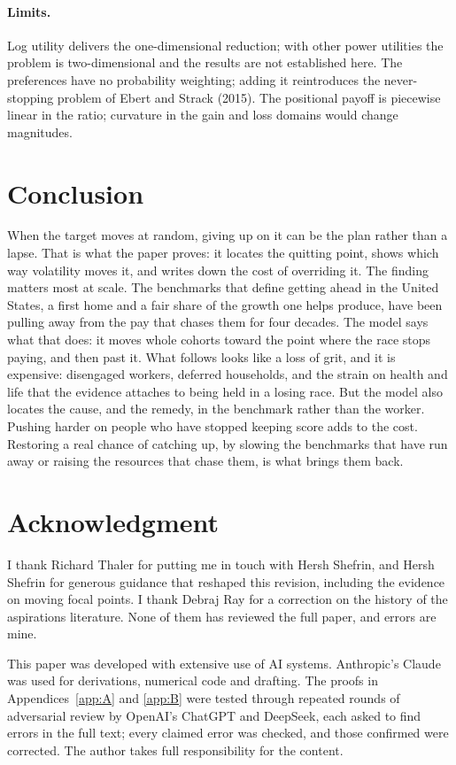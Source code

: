 \documentclass[12pt]{article}
\theoremstyle{definition}
\theoremstyle{remark}
\theoremstyle{plain}
\theoremstyle{definition}
\begin{document}
\paragraph{Limits.} Log utility delivers the one-dimensional reduction; with other power utilities the problem is two-dimensional and the results are not established here. The preferences have no probability weighting; adding it reintroduces the never-stopping problem of Ebert and Strack (2015). The positional payoff is piecewise linear in the ratio; curvature in the gain and loss domains would change magnitudes.

\section{Conclusion}\label{sec:conclusion}

When the target moves at random, giving up on it can be the plan rather than a lapse. That is what the paper proves: it locates the quitting point, shows which way volatility moves it, and writes down the cost of overriding it. The finding matters most at scale. The benchmarks that define getting ahead in the United States, a first home and a fair share of the growth one helps produce, have been pulling away from the pay that chases them for four decades. The model says what that does: it moves whole cohorts toward the point where the race stops paying, and then past it. What follows looks like a loss of grit, and it is expensive: disengaged workers, deferred households, and the strain on health and life that the evidence attaches to being held in a losing race. But the model also locates the cause, and the remedy, in the benchmark rather than the worker. Pushing harder on people who have stopped keeping score adds to the cost. Restoring a real chance of catching up, by slowing the benchmarks that have run away or raising the resources that chase them, is what brings them back.

\section*{Acknowledgment}
I thank Richard Thaler for putting me in touch with Hersh Shefrin, and Hersh Shefrin for generous guidance that reshaped this revision, including the evidence on moving focal points. I thank Debraj Ray for a correction on the history of the aspirations literature. None of them has reviewed the full paper, and errors are mine.

This paper was developed with extensive use of AI systems. Anthropic's Claude was used for derivations, numerical code and drafting. The proofs in Appendices~\ref{app:A} and \ref{app:B} were tested through repeated rounds of adversarial review by OpenAI's ChatGPT and DeepSeek, each asked to find errors in the full text; every claimed error was checked, and those confirmed were corrected. The author takes full responsibility for the content.
\end{document}
